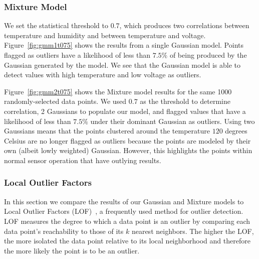 \subsubsection{Mixture Model}
We set the statistical threshold to $0.7$, which produces two correlations between temperature and humidity and between temperature and voltage.
Figure~\ref{fig:gmm1t075} shows the results from a single Gaussian model.
Points flagged as outliers have a likelihood of less than $7.5\%$ of being produced by the Gaussian generated by the model.
We see that the Gaussian model is able to detect values with high temperature and low voltage as outliers.
 
 
Figure~\ref{fig:gmm2t075} shows the Mixture model results for the same 1000 randomly-selected data points. 
We used $0.7$ as the threshold to determine correlation, 2 Gaussians to populate our model, and flagged values that have a likelihood of less than $7.5\%$ under their dominant Gaussian as outliers.
Using two Gaussians means that the points clustered around the temperature $120$ degrees Celsius are no longer flagged as outliers because the points are modeled by their own (albeit lowly weighted) Gaussian.
However, this highlights the points within normal sensor operation that have outlying results.
 


\subsubsection{Local Outlier Factors}
\label{sec:lof-evaluation}

In this section we compare the results of our Gaussian and Mixture models to Local Outlier Factors (LOF)~\cite{Breunig2000}, a frequently used method for outlier detection.
LOF measures the degree to which a data point is an outlier by comparing each data point's reachability to those of its $k$ nearest neighbors.
The higher the LOF, the more isolated the data point relative to its local neighborhood and therefore the more likely the point is to be an outlier.

